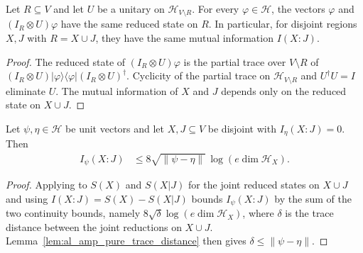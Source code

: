 \begin{lemma}
    \label{lem:al_amp_unitary_complement}
    Let $R\subseteq V$ and let $U$ be a unitary on $\mathcal H_{V\setminus R}$.
    For every $\varphi\in\mathcal H$, the vectors $\varphi$ and
    $(I_R\otimes U)\varphi$ have the same reduced state on $R$. In particular,
    for disjoint regions $X,J$ with $R=X\cup J$, they have the same mutual
    information $I(X:J)$.
\end{lemma}
\begin{proof}\leanok
    The reduced state of $(I_R\otimes U)\varphi$ is the partial trace over
    $V\setminus R$ of $(I_R\otimes U)|\varphi\rangle\langle\varphi|(I_R\otimes
        U)^\dagger$. Cyclicity of the partial trace on $\mathcal H_{V\setminus R}$
    and $U^\dagger U=I$ eliminate $U$. The mutual information of $X$ and $J$
    depends only on the reduced state on $X\cup J$.
\end{proof}

\begin{lemma}
    \label{lem:al_amp_continuity_product}
    \leanok
    Let $\psi,\eta\in\mathcal H$ be unit vectors and let $X,J\subseteq V$ be
    disjoint with $I_\eta(X:J)=0$. Then
    \begin{align*}
        I_\psi(X:J) & \le 8\sqrt{\|\psi-\eta\|}\,\log(e\dim\mathcal H_X).
    \end{align*}
\end{lemma}
\begin{proof}\leanok
    Applying \cite[Lemma~2.1]{OpenAI2026AreaLaw} to $S(X)$ and $S(X|J)$ for the
    joint reduced states on $X\cup J$ and using $I(X:J)=S(X)-S(X|J)$ bounds
    $I_\psi(X:J)$ by the sum of the two continuity bounds, namely
    $8\sqrt\delta\log(e\dim\mathcal H_X)$, where
    $\delta$ is the trace distance between the joint reductions on $X\cup J$.
    Lemma~\ref{lem:al_amp_pure_trace_distance} then gives $\delta\le\|\psi-\eta\|$.
\end{proof}

